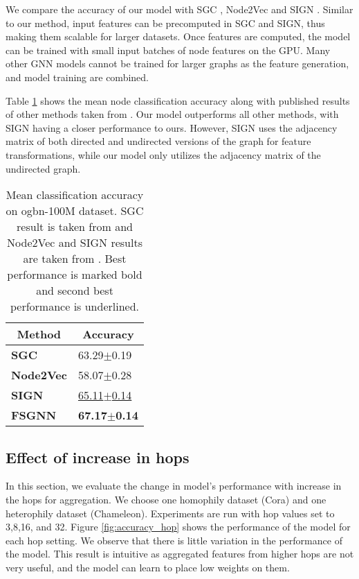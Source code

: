 \documentclass[sigconf,natbib=false]{acmart}
\begin{document}
We compare the accuracy of our model with SGC \cite{wu_simplifying_2019},  Node2Vec \cite{grover_node2vec_2016} and SIGN \cite{frasca_sign_2020}. Similar to our method, input features can be precomputed in SGC and SIGN, thus making them scalable for larger datasets. Once features are computed, the model can be trained with small input batches of node features on the GPU. Many other GNN models cannot be trained for larger graphs as the feature generation, and model training are combined. 

Table \ref{tab:scalability_result} shows the mean node classification accuracy along with published results of other methods taken from \cite{frasca_sign_2020}\cite{hu_open_2021}. Our model outperforms all other methods, with SIGN having a closer performance to ours. However, SIGN uses the adjacency matrix of both directed and undirected versions of the graph for feature transformations, while our model only utilizes the adjacency matrix of the undirected graph.




\begin{table}[h]
\centering
\caption{Mean classification accuracy on ogbn-100M dataset. SGC result is taken from \cite{hu_open_2021} and Node2Vec and SIGN results are taken from \cite{frasca_sign_2020}. Best performance is marked bold and second best performance is underlined.}
\label{tab:scalability_result}
\begin{tabular}{ll} 
\toprule
\multicolumn{1}{c}{\textbf{Method}} & \multicolumn{1}{c}{\textbf{Accuracy}}  \\ 
\hline
\textbf{SGC}                        & 63.29$\pm$0.19                                        \\
\textbf{Node2Vec}                   & 58.07$\pm$0.28                                        \\
\textbf{SIGN}                       & \uline{65.11$\pm$0.14}                                \\
\textbf{FSGNN}                      & \textbf{67.17$\pm$0.14}                               \\
\bottomrule
\end{tabular}
\end{table}

\subsection{ Effect of increase in hops }

In this section, we evaluate the change in model's performance with increase in the hops for aggregation. We choose one homophily dataset (Cora) and one heterophily dataset (Chameleon). Experiments are run with hop values set to 3,8,16, and 32. Figure \ref{fig:accuracy_hop} shows the performance of the model for each hop setting. We observe that there is little variation in the performance of the model. This result is intuitive as aggregated features from higher hops are not very useful, and the model can learn to place low weights on them. 
\end{document}
